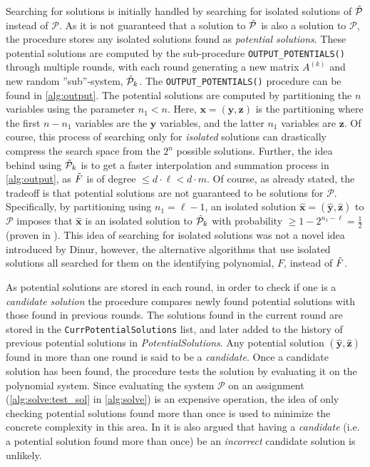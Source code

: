 Searching for solutions is initially handled by searching for isolated solutions of $\Tilde{\mathcal{P}}$ instead of $\mathcal{P}$. As it is not guaranteed that a solution to $\Tilde{\mathcal{P}}$ is also a solution to $\mathcal{P}$, the procedure stores any isolated solutions found as \textit{potential solutions}. These potential solutions are computed by the sub-procedure \texttt{OUTPUT\_POTENTIALS()} through multiple rounds, with each round generating a new matrix $A^{(k)}$ and new random ''sub''-system, $\Tilde{\mathcal{P}}_k$. The \texttt{OUTPUT\_POTENTIALS()} procedure can be found in \cref{alg:output}. The potential solutions are computed by partitioning the $n$ variables using the parameter $n_1 < n$. Here, $\mathbf{x} = (\mathbf{y}, \mathbf{z})$ is the partitioning where the first $n - n_1$ variables are the $\mathbf{y}$ variables, and the latter $n_1$ variables are $\mathbf{z}$. Of course, this process of searching only for \textit{isolated} solutions can drastically compress the search space from the $2^n$ possible solutions. Further, the idea behind using $\Tilde{\mathcal{P}}_k$ is to get a faster interpolation and summation process in \cref{alg:output}, as $\Tilde{F}$ is of degree $ \leq d \cdot \ell < d \cdot m$. Of course, as already stated, the tradeoff is that potential solutions are not guaranteed to be solutions for $\mathcal{P}$. Specifically, by partitioning using $n_1 = \ell - 1$, an isolated solution $\hat{\mathbf{x}} = (\mathbf{\hat{y}}, \mathbf{\hat{z}})$ to $\mathcal{P}$ imposes that $\hat{\mathbf{x}}$ is an isolated solution to $\Tilde{\mathcal{P}}_k$ with probability $\geq 1 - 2^{n_1 - \ell} = \frac{1}{2}$ (proven in \cite{eurocrypt-2021-30841}). This idea of searching for isolated solutions was not a novel idea introduced by Dinur, however, the alternative algorithms that use isolated solutions all searched for them on the identifying polynomial, $F$, instead of $\Tilde{F}$.

As potential solutions are stored in each round, in order to check if one is a \textit{candidate solution} the procedure compares newly found potential solutions with those found in previous rounds. The solutions found in the current round are stored in the \texttt{CurrPotentialSolutions} list, and later added to the history of previous potential solutions in \textit{PotentialSolutions}. Any potential solution $(\hat{\mathbf{y}}, \hat{\mathbf{z}})$ found in more than one round is said to be a \textit{candidate}. Once a candidate solution has been found, the procedure tests the solution by evaluating it on the polynomial system. Since evaluating the system $\mathcal{P}$ on an assignment (\cref{alg:solve:test_sol} in \cref{alg:solve}) is an expensive operation, the idea of only checking potential solutions found more than once is used to minimize the concrete complexity in this area. In \cite{eurocrypt-2021-30841} it is also argued that having a \textit{candidate} (i.e. a potential solution found more than once) be an \textit{incorrect} candidate solution is unlikely.

